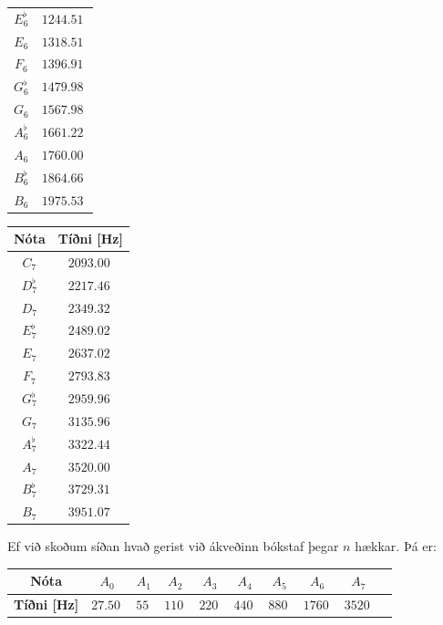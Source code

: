 \begin{table}[H]
\begin{center}
\begin{tabular}{|c|c|}
$E^\flat_6$ & $\SI{1244.51}{}$ \\
$E_6$ & $\SI{1318.51}{}$ \\
$F_6$ & $\SI{1396.91}{}$ \\
$G^\flat_6$ & $\SI{1479.98}{}$ \\
$G_6$ & $\SI{1567.98}{}$ \\
$A^\flat_6$ & $\SI{1661.22}{}$ \\
$A_6$ & $\SI{1760.00}{}$ \\
$B^\flat_6$ & $\SI{1864.66}{}$ \\
$B_6$ & $\SI{1975.53}{}$ \\
\hline
\end{tabular}
\quad
\begin{tabular}{|c|c|}
\hline
\textbf{Nóta} & \textbf{Tíðni [Hz]} \\
\hline
\hline
$C_7$ & $\SI{2093.00}{}$ \\
$D^\flat_7$ & $\SI{2217.46}{}$ \\
$D_7$ & $\SI{2349.32}{}$ \\
$E^\flat_7$ & $\SI{2489.02}{}$ \\
$E_7$ & $\SI{2637.02}{}$ \\
$F_7$ & $\SI{2793.83}{}$ \\
$G^\flat_7$ & $\SI{2959.96}{}$ \\
$G_7$ & $\SI{3135.96}{}$ \\
$A^\flat_7$ & $\SI{3322.44}{}$ \\
$A_7$ & $\SI{3520.00}{}$ \\
$B^\flat_7$ & $\SI{3729.31}{}$ \\
$B_7$ & $\SI{3951.07}{}$ \\
\hline
\end{tabular}
\end{center}
\end{table}

Ef við skoðum síðan hvað gerist við ákveðinn bókstaf þegar $n$ hækkar. Þá er:

\begin{table}[H]
    \centering
\begin{tabular}{|c|c|c|c|c|c|c|c|c|c|}
\hline
\textbf{Nóta} & $A_0$ & $A_1$ & $A_2$ & $A_3$ & $A_4$ & $A_5$ & $A_6$ & $A_7$ \\
\hline
\textbf{Tíðni [Hz]} & $\SI{27.50}{}$ & $\SI{55}{}$ & $\SI{110}{}$ & $\SI{220}{}$ & $\SI{440}{}$ & $\SI{880}{}$ & $\SI{1760}{}$ & $\SI{3520}{}$ \\
\hline
\end{tabular}
\end{table}


